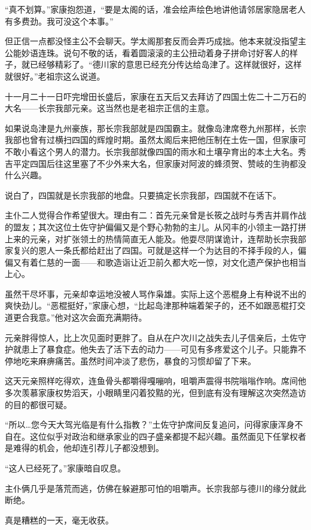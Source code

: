 \documentclass[
]{article}
\begin{document}
``真不划算。''家康抱怨道，``要是太阁的话，准会绘声绘色地讲他请邻居家隐居老人有多费劲。我可没这个本事。''

但正信一点都没怪主公不会聊天。学太阁那套反而会弄巧成拙。他本来就没指望主公能妙语连珠。说句不敬的话，看着圆滚滚的主公扭动着身子拼命讨好客人的样子，就已经够精彩了。``德川家的意思已经充分传达给岛津了。这样就很好，这样就很好。''老祖宗这么说道。

十一月二十一日吓完增田长盛后，家康在五天后又去拜访了四国土佐二十二万石的大名------长宗我部元亲。这当然也是老祖宗正信的主意。

如果说岛津是九州豪族，那长宗我部就是四国霸主。就像岛津席卷九州那样，长宗我部也曾有过横扫四国的辉煌时期。虽然太阁后来把他压制在土佐一国，但家康可不敢小看这个男人的潜力。长宗我部就像四国的雨水和土壤孕育出的本土大名。秀吉平定四国后往这里塞了不少外来大名，但家康对阿波的蜂须贺、赞岐的生驹都没什么兴趣。

说白了，四国就是长宗我部的地盘。只要搞定长宗我部，四国就不在话下。

主仆二人觉得合作希望很大。理由有二：首先元亲曾是长筱之战时与秀吉并肩作战的盟友；其次这位土佐守护偏偏又是个野心勃勃的主儿。从冈丰的小领主一路打拼上来的元亲，对扩张领土的热情简直无人能及。他耍尽阴谋诡计，连帮助长宗我部家复兴的恩人一条氏都给赶出了四国。可就是这样一个为达目的不择手段的人，偏偏又有着仁慈的一面------和歌造诣让近卫前久都大吃一惊，对文化遗产保护也相当上心。

虽然干尽坏事，元亲却幸运地没被人骂作枭雄。实际上这个恶棍身上有种说不出的爽快劲儿。``恶棍挺好，''家康心想，``比起岛津那种端着架子的，还不如跟恶棍打交道更合我意。''他对这次会面充满期待。

元亲胖得惊人，比上次见面时更胖了。自从在户次川之战失去儿子信亲后，土佐守护就患上了暴食症。他失去了活下去的动力------可见有多疼爱这个儿子。只能靠不停地吃来麻痹痛苦。虽然时间冲淡了悲伤，暴食的习惯却留了下来。

这天元亲照样吃得欢，连鱼骨头都嚼得嘎嘣响，咀嚼声震得书院嗡嗡作响。席间他多次羡慕家康权势滔天，小眼睛里闪着狡黠的光，但到底有没有理解这次突然造访的目的都很可疑。

``所以\ldots 您今天大驾光临是有什么指教？''土佐守护席间反复追问，问得家康浑身不自在。这位似乎对政治和继承家业的四子盛亲都提不起兴趣。虽然面见下任掌权者是难得的机会，他却连引荐儿子都没想到。

``这人已经死了。''家康暗自叹息。

主仆俩几乎是落荒而逃，仿佛在躲避那可怕的咀嚼声。长宗我部与德川的缘分就此断绝。

真是糟糕的一天，毫无收获。
\end{document}
